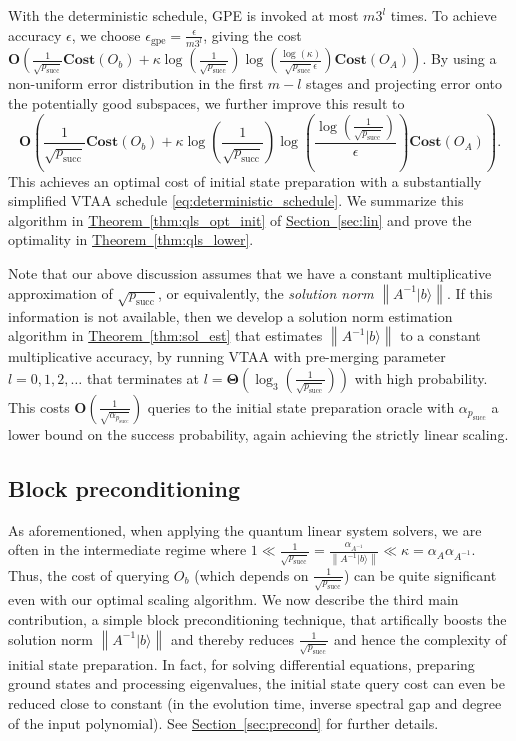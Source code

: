 \documentclass[letterpaper,onecolumn,11pt,accepted=2026-02-14]{quantumarticle}
\newcommand{\norm}[1]{\left\lVert#1\right\rVert}
\theoremstyle{remark}
\theoremstyle{plain}
\newcommand{\eq}[1]{\cref{eq:#1}}
\newcommand{\thm}[1]{\hyperref[thm:#1]{Theorem~\ref*{thm:#1}}}
\renewcommand{\sec}[1]{\hyperref[sec:#1]{Section~\ref*{sec:#1}}}
\newcommand{\ket}[1]{|#1\rangle}
\begin{document}
With the deterministic schedule, GPE is invoked at most $m3^l$ times. To achieve accuracy $\epsilon$, we choose $\epsilon_{\text{gpe}}=\frac{\epsilon}{m3^l}$, giving the cost
$\mathbf{O}\left(\frac{1}{\sqrt{p_{\text{succ}}}}\mathbf{Cost}(O_b)
    +\kappa\log\left(\frac{1}{\sqrt{p_{\text{succ}}}}\right)\log\left(\frac{\log(\kappa)}{\sqrt{p_{\text{succ}}}\epsilon}\right)\mathbf{Cost}(O_A)\right)$.
By using a non-uniform error distribution in the first $m-l$ stages and projecting error onto the potentially good subspaces, we further improve this result to
\begin{equation}
    \mathbf{O}\left(\frac{1}{\sqrt{p_{\text{succ}}}}\mathbf{Cost}(O_b)
    +\kappa\log\left(\frac{1}{\sqrt{p_{\text{succ}}}}\right)\log\left(\frac{\log\left(\frac{1}{\sqrt{p_{\text{succ}}}}\right)}{\epsilon}\right)\mathbf{Cost}(O_A)\right).
\end{equation}
This achieves an optimal cost of initial state preparation with a substantially simplified VTAA schedule \eq{deterministic_schedule}. We summarize this algorithm in \thm{qls_opt_init} of \sec{lin} and prove the optimality in \thm{qls_lower}.

Note that our above discussion assumes that we have a constant multiplicative approximation of $\sqrt{p_{\text{succ}}}$, or equivalently, the \emph{solution norm} $\norm{A^{-1}\ket{b}}$. If this information is not available, then we develop a solution norm estimation algorithm in \thm{sol_est} that estimates $\norm{A^{-1}\ket{b}}$ to a constant multiplicative accuracy, by running VTAA with pre-merging parameter $l=0,1,2,\ldots$ that terminates at $l=\mathbf{\Theta}\left(\log_3\left(\frac{1}{\sqrt{p_{\text{succ}}}}\right)\right)$ with high probability. This costs $\mathbf{O}\left(\frac{1}{\sqrt{\alpha_{p_{\text{succ}}}}}\right)$ queries to the initial state preparation oracle with $\alpha_{p_{\text{succ}}}$ a lower bound on the success probability, again achieving the strictly linear scaling.

\subsection{Block preconditioning}
\label{sec:intro_precond}
As aforementioned, when applying the quantum linear system solvers, we are often in the intermediate regime where $1\ll \frac{1}{\sqrt{p_{\text{succ}}}}=\frac{\alpha_{A^{-1}}}{\norm{A^{-1}\ket{b}}}
    \ll \kappa=\alpha_{A}\alpha_{A^{-1}}$. 
Thus, the cost of querying $O_b$ (which depends on $\frac{1}{\sqrt{p_{\text{succ}}}}$) can be quite significant even with our optimal scaling algorithm. We now describe the third main contribution, a simple block preconditioning technique, that artifically boosts the solution norm $\norm{A^{-1}\ket{b}}$ and thereby reduces $\frac{1}{\sqrt{p_{\text{succ}}}}$ and hence the complexity of initial state preparation. In fact, for solving differential equations, preparing ground states and processing eigenvalues, the initial state query cost can even be reduced close to constant (in the evolution time, inverse spectral gap and degree of the input polynomial). See \sec{precond} for further details.
\end{document}

